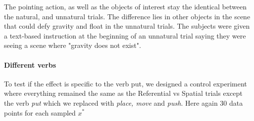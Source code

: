 The pointing action, as well as the objects of interest stay the identical between the natural, and unnatural trials. The difference lies in other objects in the scene that could defy gravity and float in the unnatural trials. The subjects were given a text-based instruction at the beginning of an unnatural trial saying they were seeing a scene where "gravity does not exist". 



\paragraph{Different verbs}  
To test if the effect is specific to the verb put, we designed a control experiment where everything remained the same as the Referential vs Spatial trials except the verb \textit{put} which we replaced with \textit{place, move} and \textit{push}. Here again 30 data points for each sampled $x^*$


